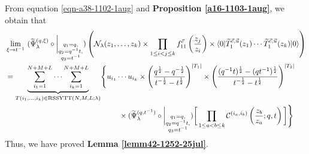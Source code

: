 \documentclass[12pt,reqno,a4paper]{amsart}
\newcommand{\comp}{\circ}
\newcommand{\cals}[1]{\mathcal{#1}}
\numberwithin{equation}{section}
\newcommand{\dualmap}{
\widetilde{\Psi}^{(q,\xi)}_{\lambda}
}
\theoremstyle{definition}
\begin{document}
From equation \eqref{eqn-a38-1102-1aug} and \textbf{Proposition \ref{a16-1103-1aug}}, we obtain that 
\footnotesize
\begin{align}
	&
	\lim_{\xi \rightarrow t^{-1}}\,\,
	(
	\dualmap
	\comp 
	\bigg|_{
		\substack{
			q_1 = q, \\
			q_2 = q^{-1}t,\\
			q_3 = t^{-1} \\
		}
	}
	)
	\left(
	\cals{N}_{\lambda}(z_1,\dots,z_k )
	\times
	\prod_{1 \leq i < j \leq k}f^{\vec{c}}_{11}\left(\frac{z_j}{z_i} \right)
	\times
	\langle 0 |\widetilde{T}^{\vec{c},\vec{u}}_{1}(z_1 )\cdots \widetilde{T}^{\vec{c},\vec{u}}_{1}(z_k )|0\rangle
	\right)
	\\
	&= 
	\underbrace{				
		\sum_{i_1 = 1}^{N+M+L}
		\cdots
		\sum_{i_k = 1}^{N+M+L}
	}_{
		T(i_1,\dots,i_k) \in 
		\operatorname{RSSYTT}(N,M,L;\lambda)
	}
	\Biggl\{
	u_{i_1}\cdots u_{i_k}
	\times
	\left(
	\frac{
		q^{\frac{1}{2}} - q^{-\frac{1}{2}}
	}{
		t^{-\frac{1}{2}} - t^{\frac{1}{2}}
	}
	\right)^{|T_1|}
	\times
	\left(
	\frac{
		(q^{-1}t)^{\frac{1}{2}} - (qt^{-1})^{\frac{1}{2}}
	}{
		t^{-\frac{1}{2}} - t^{\frac{1}{2}}
	}
	\right)^{|T_2|}
	\notag 
	\\
	&\hspace{5.3cm}\times
	(
	\widetilde{\Psi}_{\lambda}^{(q,t^{-1})}
	\comp 
	\bigg|_{
		\substack{
			q_1 = q, \\
			q_2 = q^{-1}t,\\
			q_3 = t^{-1} \\
		}
	}
	)
	\bigg[
	\prod_{1 \leq a < b \leq k}
	\cals{C}^{(i_a,i_b)}\left(
	\frac{z_b}{z_a}
	; q, t
	\right)
	\bigg]
	\Biggr\}
	\notag 
\end{align}
\normalsize
Thus, we have proved \textbf{Lemma \ref{lemm42-1252-25jul}}. 
\end{document}
